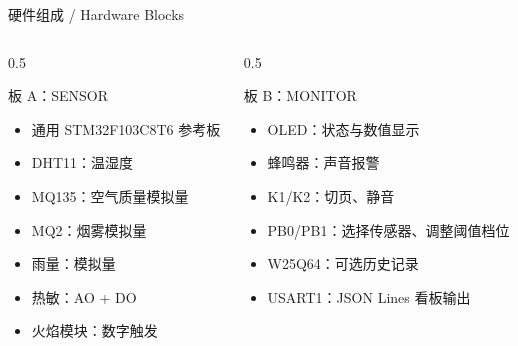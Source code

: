 \documentclass[aspectratio=169,10pt]{ctexbeamer}
\begin{document}
\begin{frame}{硬件组成 / Hardware Blocks}
  \begin{columns}[T,onlytextwidth]
    \begin{column}{0.5\textwidth}
      \begin{block}{板 A：SENSOR}
        \begin{itemize}
          \item 通用 STM32F103C8T6 参考板
          \item DHT11：温湿度
          \item MQ135：空气质量模拟量
          \item MQ2：烟雾模拟量
          \item 雨量：模拟量
          \item 热敏：AO + DO
          \item 火焰模块：数字触发
        \end{itemize}
      \end{block}
    \end{column}
    \begin{column}{0.5\textwidth}
      \begin{block}{板 B：MONITOR}
        \begin{itemize}
          \item OLED：状态与数值显示
          \item 蜂鸣器：声音报警
          \item K1/K2：切页、静音
          \item PB0/PB1：选择传感器、调整阈值档位
          \item W25Q64：可选历史记录
          \item USART1：JSON Lines 看板输出
        \end{itemize}
      \end{block}
    \end{column}
  \end{columns}
\end{frame}
\end{document}
